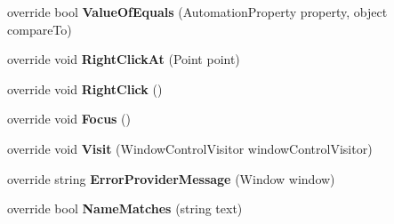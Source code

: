 \begin{DoxyCompactItemize}
\item 
\hypertarget{class_proto_test_1_1_golem_1_1_white_1_1_elements_1_1_white_text_box_accf131b1a49944e1447ecc8daf0e876f}{override bool {\bfseries Value\-Of\-Equals} (Automation\-Property property, object compare\-To)}\label{class_proto_test_1_1_golem_1_1_white_1_1_elements_1_1_white_text_box_accf131b1a49944e1447ecc8daf0e876f}

\item 
\hypertarget{class_proto_test_1_1_golem_1_1_white_1_1_elements_1_1_white_text_box_a0ee2cffd871e65661eaa429690ce5bd0}{override void {\bfseries Right\-Click\-At} (Point point)}\label{class_proto_test_1_1_golem_1_1_white_1_1_elements_1_1_white_text_box_a0ee2cffd871e65661eaa429690ce5bd0}

\item 
\hypertarget{class_proto_test_1_1_golem_1_1_white_1_1_elements_1_1_white_text_box_a3cde8a967d520415fc7a4ae0fadbd920}{override void {\bfseries Right\-Click} ()}\label{class_proto_test_1_1_golem_1_1_white_1_1_elements_1_1_white_text_box_a3cde8a967d520415fc7a4ae0fadbd920}

\item 
\hypertarget{class_proto_test_1_1_golem_1_1_white_1_1_elements_1_1_white_text_box_a5063c54b6a798d105df0d8da75ff3016}{override void {\bfseries Focus} ()}\label{class_proto_test_1_1_golem_1_1_white_1_1_elements_1_1_white_text_box_a5063c54b6a798d105df0d8da75ff3016}

\item 
\hypertarget{class_proto_test_1_1_golem_1_1_white_1_1_elements_1_1_white_text_box_ae07d85cbfd1b882f273795acdcb9a7fd}{override void {\bfseries Visit} (Window\-Control\-Visitor window\-Control\-Visitor)}\label{class_proto_test_1_1_golem_1_1_white_1_1_elements_1_1_white_text_box_ae07d85cbfd1b882f273795acdcb9a7fd}

\item 
\hypertarget{class_proto_test_1_1_golem_1_1_white_1_1_elements_1_1_white_text_box_a661bf95d0225cfe51f36e479e9e584d3}{override string {\bfseries Error\-Provider\-Message} (Window window)}\label{class_proto_test_1_1_golem_1_1_white_1_1_elements_1_1_white_text_box_a661bf95d0225cfe51f36e479e9e584d3}

\item 
\hypertarget{class_proto_test_1_1_golem_1_1_white_1_1_elements_1_1_white_text_box_a26130fa5e76cf8d4f4c2d90f6df8833a}{override bool {\bfseries Name\-Matches} (string text)}\label{class_proto_test_1_1_golem_1_1_white_1_1_elements_1_1_white_text_box_a26130fa5e76cf8d4f4c2d90f6df8833a}


\end{DoxyCompactItemize}
